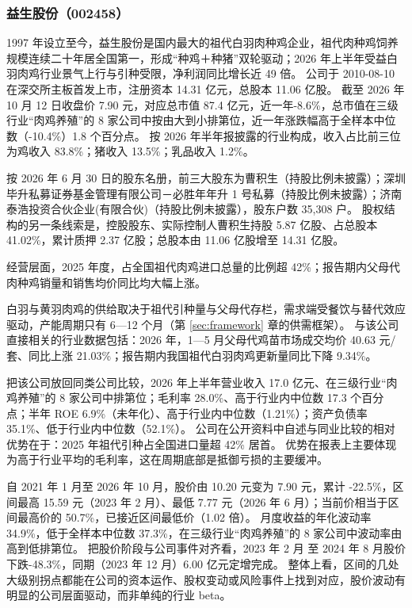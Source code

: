 \subsubsection{益生股份（002458）}
\label{co:002458}

 1997 年设立至今，益生股份是国内最大的祖代白羽肉种鸡企业，祖代肉种鸡饲养规模连续二十年居全国第一，形成“种鸡＋种猪”双轮驱动；2026 年上半年受益白羽肉鸡行业景气上行与引种受限，净利润同比增长近 49 倍。 公司于 2010-08-10 在深交所主板首发上市，注册资本 14.31 亿元，总股本 11.06 亿股。 截至 2026 年 10 月 12 日收盘价 7.90 元，对应总市值 87.4 亿元，近一年-8.6\%，总市值在三级行业“肉鸡养殖”的 8 家公司中按由大到小排第位，近一年涨跌幅高于全样本中位数（-10.4\%）1.8 个百分点。 按 2026 年半年报披露的行业构成，收入占比前三位为鸡收入 83.8\%；猪收入 13.5\%；乳品收入 1.2\%。

 按 2026 年 6 月 30 日的股东名册，前三大股东为曹积生（持股比例未披露）；深圳毕升私募证券基金管理有限公司－必胜年年升 1 号私募（持股比例未披露）；济南泰浩投资合伙企业(有限合伙)（持股比例未披露），股东户数 35,308 户。 股权结构的另一条线索是，控股股东、实际控制人曹积生持股 5.87 亿股、占总股本 41.02\%，累计质押 2.37 亿股；总股本由 11.06 亿股增至 14.31 亿股。

 经营层面，2025 年度，占全国祖代肉鸡进口总量的比例超 42\%；报告期内父母代肉种鸡销量和销售均价同比均大幅上涨。

 白羽与黄羽肉鸡的供给取决于祖代引种量与父母代存栏，需求端受餐饮与替代效应驱动，产能周期只有 6---12 个月（第 \ref{sec:framework} 章的供需框架）。 与该公司直接相关的行业数据包括：2026 年，1—5 月父母代鸡苗市场成交均价 40.63 元/套、同比上涨 21.03\%；报告期内我国祖代白羽肉鸡更新量同比下降 9.34\%。

 把该公司放回同类公司比较，2026 年上半年营业收入 17.0 亿元、在三级行业“肉鸡养殖”的 8 家公司中排第位；毛利率 28.0\%、高于行业内中位数 17.3 个百分点；半年 ROE 6.9\%（未年化）、高于行业内中位数（1.21\%）；资产负债率 35.1\%、低于行业内中位数（52.1\%）。 公司在公开资料中自述与同业比较的相对优势在于：2025 年祖代引种占全国进口量超 42\% 居首。 优势在报表上主要体现为高于行业平均的毛利率，这在周期底部是抵御亏损的主要缓冲。

 自 2021 年 1 月至 2026 年 10 月，股价由 10.20 元变为 7.90 元，累计 -22.5\%，区间最高 15.59 元（2023 年 2 月）、最低 7.77 元（2026 年 6 月）；当前价相当于区间最高价的 50.7\%，已接近区间最低价（1.02 倍）。 月度收益的年化波动率 34.9\%，低于全样本中位数 37.3\%，在三级行业“肉鸡养殖”的 8 家公司中波动率由高到低排第位。 把股价阶段与公司事件对齐看，2023 年 2 月 至 2024 年 8 月股价下跌-48.3\%，同期（2023 年 12 月）6.00 亿元定增完成。 整体上看，区间的几处大级别拐点都能在公司的资本运作、股权变动或风险事件上找到对应，股价波动有明显的公司层面驱动，而非单纯的行业 beta。

